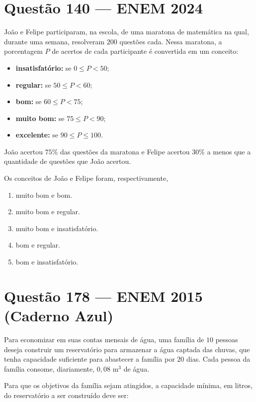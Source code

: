 \documentclass[11pt,a4paper]{article}
\begin{document}
\section*{Questão 140 --- ENEM 2024}

João e Felipe participaram, na escola, de uma maratona de matemática na qual, durante uma semana, resolveram $200$ questões cada. Nessa maratona, a porcentagem $P$ de acertos de cada participante é convertida em um conceito:

\begin{itemize}
    \item \textbf{insatisfatório:} se $0 \le P < 50$;
    \item \textbf{regular:} se $50 \le P < 60$;
    \item \textbf{bom:} se $60 \le P < 75$;
    \item \textbf{muito bom:} se $75 \le P < 90$;
    \item \textbf{excelente:} se $90 \le P \le 100$.
\end{itemize}

João acertou $75\%$ das questões da maratona e Felipe acertou $30\%$ a menos que a quantidade de questões que João acertou.

Os conceitos de João e Felipe foram, respectivamente,

\begin{enumerate}[label=(\Alph*)]
    \item muito bom e bom.
    \item muito bom e regular.
    \item muito bom e insatisfatório.
    \item bom e regular.
    \item bom e insatisfatório.
\end{enumerate}

\section*{Questão 178 --- ENEM 2015 (Caderno Azul)}

Para economizar em suas contas mensais de água, uma família de $10$ pessoas deseja construir um reservatório para armazenar a água captada das chuvas, que tenha capacidade suficiente para abastecer a família por $20$ dias. Cada pessoa da família consome, diariamente, $0{,}08\text{ m}^3$ de água.

Para que os objetivos da família sejam atingidos, a capacidade mínima, em litros, do reservatório a ser construído deve ser:
\end{document}
